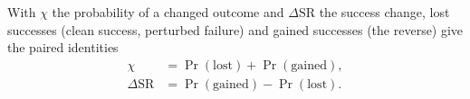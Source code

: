 With $\chi$ the probability of a changed outcome and $\Delta\mathrm{SR}$ the success change, lost successes (clean success, perturbed failure) and gained successes (the reverse) give the paired identities
\begin{equation}
\begin{aligned}
\chi&=\Pr(\mathrm{lost})+\Pr(\mathrm{gained}),\\
\Delta\mathrm{SR}&=\Pr(\mathrm{gained})-\Pr(\mathrm{lost}).
\end{aligned}
\label{eq:outcome}
\end{equation}
